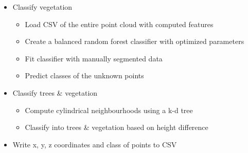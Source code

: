 \begin{itemize}
		\item Classify vegetation
		\begin{itemize}
			\item Load CSV of the entire point cloud with computed features
			\item Create a balanced random forest classifier with optimized parameters
			\item Fit classifier with manually segmented data
			\item Predict classes of the unknown points
		\end{itemize}
	
		\item Classify trees \& vegetation
		\begin{itemize}
			\item Compute cylindrical neighbourhoods using a k-d tree
			\item Classify into trees \& vegetation based on height difference
		\end{itemize}
	
		\item Write x, y, z coordinates and class of points to CSV
	\end{itemize}

